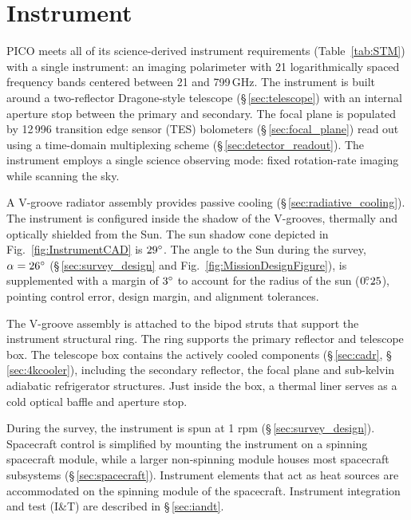 \newcommand\pdeg{.\!\!\degree}
\newcommand\parcm{.\!\!'}

\section{Instrument}
\label{sec:instrument} %

PICO meets all of its science-derived instrument requirements (Table~\ref{tab:STM})
with a single instrument: an imaging polarimeter with 21 logarithmically spaced frequency
bands centered between 21 and 799\,GHz. The instrument is built around
a two-reflector Dragone-style telescope
(\S\,\ref{sec:telescope}) with an internal aperture stop between the
primary and secondary. The focal plane is populated by 12\,996
transition edge sensor (TES) bolometers (\S\,\ref{sec:focal_plane})
read out using a time-domain multiplexing scheme
(\S\,\ref{sec:detector_readout}). The instrument employs a single
science observing mode: fixed rotation-rate imaging while scanning the
sky.


A V-groove radiator assembly provides passive cooling
(\S\,\ref{sec:radiative_cooling}). The instrument is configured inside
the shadow of the V-grooves, thermally and optically shielded from the
Sun. The sun shadow cone depicted in Fig.~\ref{fig:InstrumentCAD} is
$29^\circ$. The angle to the Sun during the survey, $\alpha = 26^\circ$
(\S\,\ref{sec:survey_design} and Fig.~\ref{fig:MissionDesignFigure}), is supplemented with a margin of
$3^\circ$ to account for the radius of the sun ($0\pdeg25$), pointing
control error, design margin, and alignment tolerances.

The V-groove assembly is attached to the bipod struts that support the
instrument structural ring. The ring supports the primary reflector
and telescope box. The telescope box contains the actively cooled
components (\S\,\ref{sec:cadr}, \S\,\ref{sec:4kcooler}), including
the secondary reflector, the focal plane and sub-kelvin adiabatic
refrigerator structures. Just inside the box, a thermal liner serves
as a cold optical baffle and aperture stop.

During the survey, the instrument is spun at 1 rpm
(\S\,\ref{sec:survey_design}). Spacecraft control is simplified by
mounting the instrument on a spinning spacecraft module, while a
larger non-spinning module houses most spacecraft subsystems
(\S\,\ref{sec:spacecraft}). Instrument elements that act as heat
sources are accommodated on the spinning module of the
spacecraft. Instrument integration and test (I\&T) are described in
\S\,\ref{sec:iandt}.



